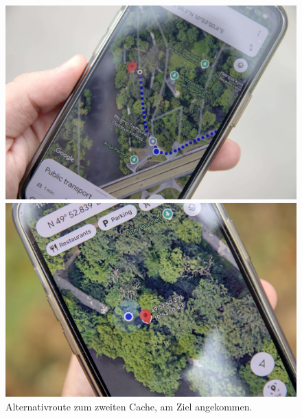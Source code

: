 \begin{figure}[h]
    \centering
    \begin{minipage}{.5\textwidth}
        \centering
        \includegraphics[width=.95\linewidth]{figures/geocaching/second/IMG_3107.jpg}
    \end{minipage}%
    \begin{minipage}{.5\textwidth}
        \centering
        \includegraphics[width=.95\linewidth]{figures/geocaching/second/IMG_3118.jpg}
    \end{minipage}
    \caption{Alternativroute zum zweiten Cache, am Ziel angekommen.}
    \label{second-cache-weg}
\end{figure}

